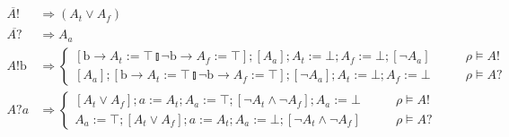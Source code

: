 \documentclass[times, 10pt]{article}
\begin{document}
\begin{align*}
    \overline{A!} & \Rightarrow (A_t \vee A_f) \\
    \overline{A?} & \Rightarrow A_a \\
    A!\mathrm{b} & \Rightarrow \left\{ \begin{matrix} [\mathrm{b} \rightarrow A_t := \top \talloblong \neg \mathrm{b} \rightarrow A_f := \top]; [A_a]; A_t := \bot; A_f := \bot; [\neg A_a] & \qquad \rho \vDash A! \\
                                                      [A_a]; [\mathrm{b} \rightarrow A_t := \top \talloblong \neg \mathrm{b} \rightarrow A_f := \top]; [\neg A_a]; A_t := \bot; A_f := \bot & \qquad \rho \vDash A? \end{matrix} \right. \\
    A?a & \Rightarrow \left\{ \begin{matrix} [A_t \vee A_f]; a := A_t; A_a := \top; [\neg A_t \wedge \neg A_f]; A_a := \bot & \qquad \rho \vDash A! \\
                                             A_a := \top; [A_t \vee A_f]; a := A_t; A_a := \bot; [\neg A_t \wedge \neg A_f] & \qquad \rho \vDash A? \end{matrix} \right. \\

\end{align*}
\end{document}
